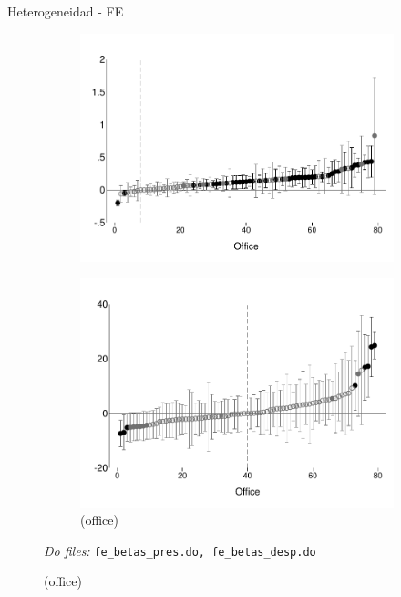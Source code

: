 \documentclass[8pt]{beamer}
\begin{document}
\begin{frame}[allowframebreaks]{Heterogeneidad - FE}
\begin{figure}[H]
\begin{center}
\begin{subfigure}{0.25\textwidth}
            \includegraphics[width=\textwidth]{Figuras/betas_desp_win_minley.pdf}
        \end{subfigure}
         \begin{subfigure}{0.25\textwidth}
            \caption*{(office)}
            \centering
            \includegraphics[width=\textwidth]{Figuras/betas_desp_duration.pdf}
        \end{subfigure}
    \end{center}
 \footnotesize
 \textit{Do files: } \texttt{fe\_betas\_pres.do, fe\_betas\_desp.do}
\end{figure}

    
\end{frame}
\end{document}
